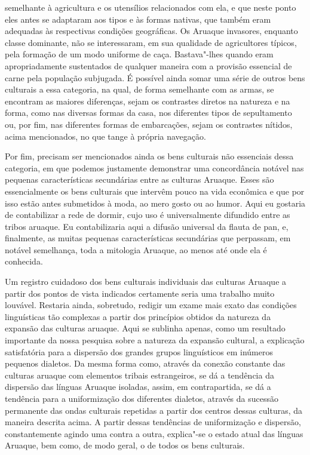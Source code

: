 semelhante à agricultura e os utensílios relacionados com ela, e que
neste ponto eles antes se adaptaram aos tipos e às formas nativas, que
também eram adequadas às respectivas condições geográficas. Os Aruaque
invasores, enquanto classe dominante, não se interessaram, em sua
qualidade de agricultores típicos, pela formação de um modo uniforme de
caça. Bastava"-lhes quando eram apropriadamente sustentados de qualquer
maneira com a provisão essencial de carne pela população subjugada. É
possível ainda somar uma série de outros bens culturais a essa
categoria, na qual, de forma semelhante com as armas, se encontram as
maiores diferenças, sejam os contrastes diretos na natureza e na forma,
como nas diversas formas da casa, nos diferentes tipos de sepultamento
ou, por fim, nas diferentes formas de embarcações, sejam os contrastes
nítidos, acima mencionados, no que tange à própria navegação.

Por fim, precisam ser mencionados ainda os bens culturais não essenciais
dessa categoria, em que podemos justamente demonstrar uma concordância
notável nas pequenas características secundárias entre as culturas
Aruaque. Esses são essencialmente os bens culturais que intervêm pouco
na vida econômica e que por isso estão antes submetidos à moda, ao mero
gosto ou ao humor. Aqui eu gostaria de contabilizar a rede de dormir,
cujo uso é universalmente difundido entre as tribos aruaque. Eu
contabilizaria aqui a difusão universal da flauta de pan, e, finalmente,
as muitas pequenas características secundárias que perpassam, em notável
semelhança, toda a mitologia Aruaque, ao menos até onde ela é conhecida.

Um registro cuidadoso dos bens culturais individuais das culturas
Aruaque a partir dos pontos de vista indicados certamente seria uma
trabalho muito louvável. Restaria ainda, sobretudo, redigir um exame
mais exato das condições linguísticas tão complexas a partir dos
princípios obtidos da natureza da expansão das culturas aruaque. Aqui se
sublinha apenas, como um resultado importante da nossa pesquisa sobre a
natureza da expansão cultural, a explicação satisfatória para a
dispersão dos grandes grupos linguísticos em inúmeros pequenos dialetos.
Da mesma forma como, através da conexão constante das culturas aruaque
com elementos tribais estrangeiros, se dá a tendência da dispersão das
línguas Aruaque isoladas, assim, em contrapartida, se dá a tendência
para a uniformização dos diferentes dialetos, através da sucessão
permanente das ondas culturais repetidas a partir dos centros dessas
culturas, da maneira descrita acima. A partir dessas tendências de
uniformização e dispersão, constantemente agindo uma contra a outra,
explica"-se o estado atual das línguas Aruaque, bem como, de modo geral,
o de todos os bens culturais.

